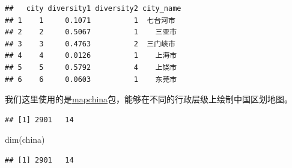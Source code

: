 \documentclass[
  oneside]{book}
\newenvironment{Shaded}{\begin{snugshade}}{\end{snugshade}}
\newcommand{\AttributeTok}[1]{\textcolor[rgb]{0.77,0.63,0.00}{#1}}
\newcommand{\ConstantTok}[1]{\textcolor[rgb]{0.00,0.00,0.00}{#1}}
\newcommand{\FunctionTok}[1]{\textcolor[rgb]{0.00,0.00,0.00}{#1}}
\newcommand{\NormalTok}[1]{#1}
\newcommand{\OtherTok}[1]{\textcolor[rgb]{0.56,0.35,0.01}{#1}}
\newcommand{\SpecialCharTok}[1]{\textcolor[rgb]{0.00,0.00,0.00}{#1}}
\begin{document}
\begin{verbatim}
##   city diversity1 diversity2 city_name
## 1    1     0.1071          1  七台河市
## 2    2     0.5067          1    三亚市
## 3    3     0.4763          2  三门峽市
## 4    4     0.0126          1    上海市
## 5    5     0.5792          4    上饶市
## 6    6     0.0603          1    东莞市
\end{verbatim}

我们这里使用的是\href{https://github.com/xmc811/mapchina}{mapchina}包，能够在不同的行政层级上绘制中国区划地图。

\begin{Shaded}
\end{Shaded}

\begin{verbatim}
## [1] 2901   14
\end{verbatim}

\begin{Shaded}
\begin{Highlighting}[]
\FunctionTok{dim}\NormalTok{(china)}
\end{Highlighting}
\end{Shaded}

\begin{verbatim}
## [1] 2901   14
\end{verbatim}
\end{document}
